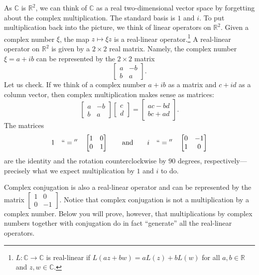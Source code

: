 \documentclass[12pt,openany]{book}
\newcommand{\C}{{\mathbb{C}}}
\newcommand{\R}{{\mathbb{R}}}
\newcommand{\myquote}[1]{``#1''}
\theoremstyle{plain}
\theoremstyle{remark}
\theoremstyle{definition}
\theoremstyle{exercise}
\theoremstyle{example}
\begin{document}
As $\C$ is $\R^2$, we can think of
$\C$ as a real two-dimensional vector space by forgetting about the
complex multiplication.  The standard basis is $1$ and $i$.
To put multiplication back into the picture, we think of linear operators
on $\R^2$.
Given a complex number $\xi$, the map $z \mapsto  \xi z$ is a
real-linear operator.\footnote{$L \colon \C \to \C$ is real-linear if
$L(a z + b w) = aL(z)+bL(w)$ for all $a,b \in \R$ and $z,w \in \C$.}
A real-linear operator on $\R^2$ is given by a $2 \times 2$ real
matrix.
Namely, the complex number $\xi = a+ib$ can be represented by the $2 \times 2$ matrix
\begin{equation} \label{eq:complexnumbermatrix}
\begin{bmatrix}
a & -b \\
b & a
\end{bmatrix} .
\end{equation}
Let us check.
If we think of a complex number $a+ib$ as a matrix
and $c+id$ as a column vector,
then complex multiplication makes sense as matrices:
\begin{equation*}
\begin{bmatrix}
a & -b \\
b & a
\end{bmatrix}
\begin{bmatrix}
c \\
d 
\end{bmatrix}
=
\begin{bmatrix}
ac-bd \\
bc+ad
\end{bmatrix} .
\end{equation*}
The matrices
\begin{equation*}
1 \quad ``{}={}'' \quad
\begin{bmatrix}
1 & 0 \\
0 & 1
\end{bmatrix} \qquad \text{and} \qquad
i \quad ``{}={}'' \quad
\begin{bmatrix}
0 & -1 \\
1 & 0
\end{bmatrix} 
\end{equation*}
are the identity and the rotation counterclockwise by $90$ degrees,
respectively---precisely what we expect multiplication by $1$ and $i$
to do.

Complex conjugation is also a real-linear
operator and can be represented by the matrix $\left[ \begin{smallmatrix} 1 & 0 \\ 0 &
-1 \end{smallmatrix} \right]$.  Notice that complex conjugation is
not a multiplication by a complex number.
Below you will prove, however,
that multiplications by complex numbers together with conjugation do 
in fact \myquote{generate} all the real-linear operators.
\end{document}
